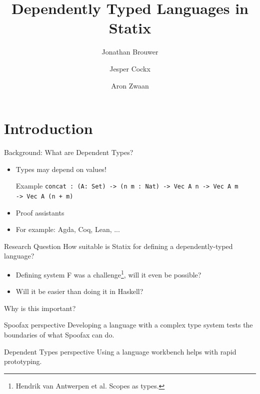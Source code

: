 \documentclass[aspectratio=43]{beamer}
\title[]{Dependently Typed Languages in Statix}
\institute[]{Delft University of Technology, The Netherlands}
\author{Jonathan Brouwer \and Jesper Cockx \and Aron Zwaan}
\begin{document}
\section{Introduction}
{
\frame{\titlepage}
}

\begin{frame}[fragile]{Background: What are Dependent Types?}
\begin{itemize}
	\item Types may depend on values!
	\begin{exampleblock}{Example}
		\texttt{concat : (A: Set) -> (n m : Nat) -> Vec A n -> Vec A m
			\\ \hspace*{48pt} -> Vec A (n + m)}
	\end{exampleblock}
	\item Proof assistants
	\item For example: Agda, Coq, Lean, ...
\end{itemize}


\end{frame}

\begin{frame}[fragile]{Research Question}
\large{How suitable is Statix for defining a dependently-typed language?}
\begin{itemize}
	\item Defining system F was a challenge\footnote{Hendrik van Antwerpen et al. Scopes as types.}, will it even be possible?
	\item Will it be easier than doing it in Haskell?
\end{itemize}

\end{frame}

\begin{frame}[fragile]{Why is this important?}
	\begin{block}{Spoofax perspective}
		Developing a language with a complex type system tests the boundaries of what Spoofax can do.
	\end{block}
	
	\begin{block}{Dependent Types perspective}
		Using a language workbench helps with rapid prototyping.
	\end{block}
\end{frame}
\end{document}
